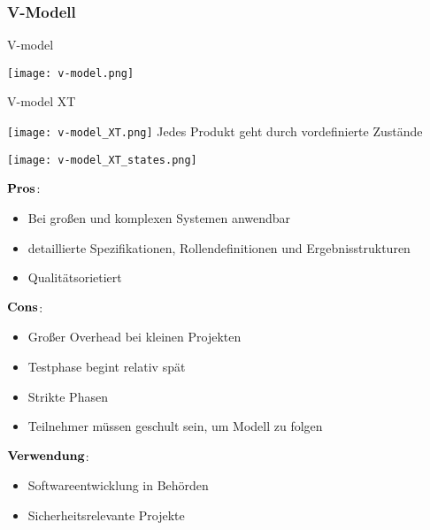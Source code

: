 \subsubsection{V-Modell}
\begin{table}[H]
\caption{V-model}
\texttt{[image: v-model.png]}
\end{table}
\begin{table}[H]
\caption{V-model XT}
\texttt{[image: v-model\_XT.png]}
Jedes Produkt geht durch vordefinierte Zustände
\begin{center}
\texttt{[image: v-model\_XT\_states.png]}	
\end{center}
\end{table}
\begin{multicols}{2}
$\bold{Pros}$:
\begin{itemize}
	\item Bei großen und komplexen Systemen anwendbar
	\item detaillierte Spezifikationen, Rollendefinitionen und Ergebnisstrukturen
	\item Qualitätsorietiert
\end{itemize}
\columnbreak
$\bold{Cons}$:
\begin{itemize}
	\item Großer Overhead bei kleinen Projekten
	\item Testphase begint relativ spät
	\item Strikte Phasen
	\item Teilnehmer müssen geschult sein, um Modell zu folgen
\end{itemize}
\end{multicols}
$\bold{Verwendung}$: \newline
\begin{itemize}
	\item Softwareentwicklung in Behörden
	\item Sicherheitsrelevante Projekte 
\end{itemize}

